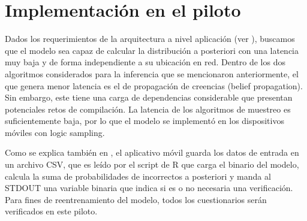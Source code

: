 \chapter{Implementación en el piloto}
\label{chap:implementacion}
Dados los requerimientos de la arquitectura a nivel aplicación (ver \cite{ec_entregable_2}), buscamos que el modelo sea capaz de calcular la distribución a posteriori con una latencia muy baja y de forma independiente a su ubicación en red. Dentro de los dos algoritmos considerados para la inferencia que se mencionaron anteriormente, el que genera menor latencia es el de propagación de creencias (belief propagation). Sin embargo, este tiene una carga de dependencias considerable que presentan potenciales retos de compilación. La latencia de los algoritmos de muestreo es suficientemente baja, por lo que el modelo se implementó en los dispositivos móviles con logic sampling.
\par
\noindent
Como se explica también en \cite{ec_entregable_2}, el aplicativo móvil guarda los datos de entrada en un archivo CSV, que es leído por el script de R que carga el binario del modelo, calcula la suma de probabilidades de incorrectos a posteriori y manda al STDOUT una variable binaria que indica si es o no necesaria una verificación. Para fines de reentrenamiento del modelo, todos los cuestionarios serán verificados en este piloto.
